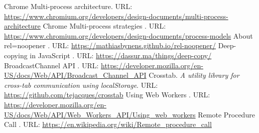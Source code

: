 

\cleardoublepage

\begin{thebibliography}{9}
  \raggedright
  
   Chrome Multi-process architecture. URL: \url{https://www.chromium.org/developers/design-documents/multi-process-architecture}
   Chrome Multi-process strategies . URL: \url{https://www.chromium.org/developers/design-documents/process-models}
   About rel=noopener . URL: \url{https://mathiasbynens.github.io/rel-noopener/}
   Deep-copying in JavaScript . URL: \url{https://dassur.ma/things/deep-copy/}
   BroadcastChannel API . URL: \url{https://developer.mozilla.org/en-US/docs/Web/API/Broadcast_Channel_API}
   Crosstab. \textit{A utility library for cross-tab communication using localStorage}. URL:  \url{https://github.com/tejacques/crosstab}
   Using Web Workers . URL: \url{https://developer.mozilla.org/en-US/docs/Web/API/Web_Workers_API/Using_web_workers}
   Remote Procedure Call . URL: \url{https://en.wikipedia.org/wiki/Remote_procedure_call}
\end{thebibliography}
